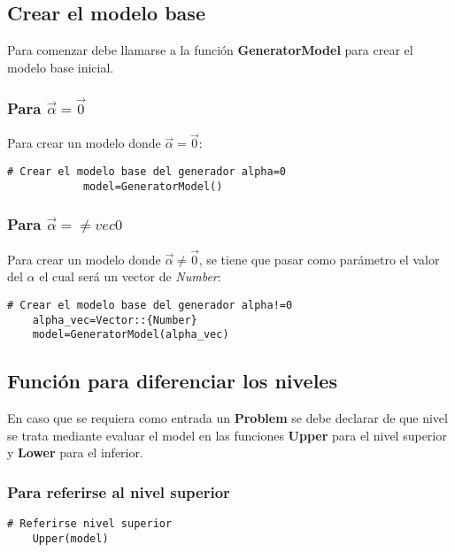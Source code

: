 \subsection{Crear el modelo base}
Para comenzar debe llamarse a la función \textbf{GeneratorModel} para crear el modelo base
inicial.

\subsubsection{Para $\vec{\alpha}=\vec{0}$ }

Para crear un modelo donde $\vec{\alpha}=\vec{0}$:
   
        \begin{lstlisting}[caption={Crear el modelo para $\vec{\alpha}=\vec{0}$}]
            # Crear el modelo base del generador alpha=0
            model=GeneratorModel()
        \end{lstlisting}
        
    
  
\begin{samepage}
\subsubsection{Para $\vec{\alpha}= \neq vec{0}$ }

Para crear un modelo donde $\vec{\alpha}\neq \vec{0}$,
se tiene que pasar como parámetro el valor del $\alpha$
el cual será un vector de \textit{Number}:

\begin{lstlisting}[caption={Crear el modelo para $\vec{\alpha } \neq \vec{0}$}]
    # Crear el modelo base del generador alpha!=0
    alpha_vec=Vector::{Number}
    model=GeneratorModel(alpha_vec)
\end{lstlisting}
\end{samepage}



\subsection{Función para diferenciar los niveles}
En caso que se requiera como entrada un \textbf{Problem} se debe declarar
de que nivel se trata mediante evaluar el model en las funciones \textbf{Upper} para el nivel 
superior y \textbf{Lower} para el inferior.

\subsubsection{Para referirse al nivel superior}
\begin{lstlisting}[caption={Referirse al nivel superior}]
    # Referirse nivel superior
    Upper(model)
\end{lstlisting}
